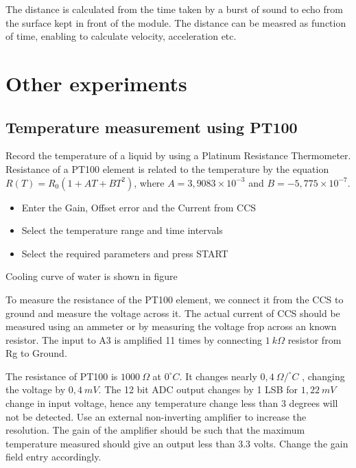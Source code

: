\documentclass[a4paper,12pt,english]{sphinxmanual}
\let\sphinxpxdimen\pdfpxdimen\else\newdimen\sphinxpxdimen
\begin{document}

The distance is calculated from the time taken by a burst of sound to
echo from the surface kept in front of the module. The distance can be
measred as function of time, enabling to calculate velocity,
acceleration etc.


\chapter{Other experiments}
\label{\detokenize{index:other-experiments}}

\section{Temperature measurement using PT100}
\label{\detokenize{6.5:temperature-measurement-using-pt100}}\label{\detokenize{6.5::doc}}

Record the temperature of a liquid by using a Platinum Resistance
Thermometer. Resistance of a PT100 element is related to the temperature
by the equation \(R(T) = R_0 (1 + AT + BT^2)\), where
\(A = 3,9083 \times 10^{-3}\) and \(B =  - 5,775 \times 10^{-7}\).

\noindent\sphinxincludegraphics[width=300\sphinxpxdimen]{{pt100}.pdf}
\noindent\sphinxincludegraphics[width=300\sphinxpxdimen]{{pt100-screen}.pdf}

\begin{itemize}
\item {} 
Enter the Gain, Offset error and the Current from CCS

\item {} 
Select the temperature range and time intervals

\item {} 
Select the required parameters and press START

\end{itemize}


Cooling curve of water is shown in figure

To measure the resistance of the PT100 element, we connect it from the
CCS to ground and measure the voltage across it. The actual current of
CCS should be measured using an ammeter or by measuring the voltage frop
across an known resistor. The input to A3 is amplified 11 times by
connecting \(1~k\Omega\) resistor from Rg to Ground.

The resistance of PT100 is \(1000~\Omega\) at \(0^\circ C\). It changes nearly \(0,4~\Omega /^\circ C\)
, changing the voltage by \(0, 4~mV\). The 12 bit ADC output changes
by 1 LSB for \(1,22~mV\) change in input voltage, hence any temperature
change less than 3 degrees will not be detected. Use an external
non-inverting amplifier to increase the resolution. The gain of the
amplifier should be such that the maximum temperature measured should
give an output less than 3.3 volts. Change the gain field entry
accordingly.
\end{document}
